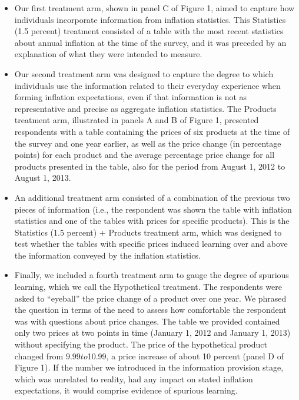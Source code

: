 \documentclass[a4paper, 12pt]{article}
\begin{document}
\begin{itemize}
\begin{itemize}
        \begin{itemize}
            \item Our first treatment arm, shown in panel C of Figure 1, aimed to capture how individuals incorporate information from inflation statistics. This Statistics (1.5 percent) treatment consisted of a table with the most recent statistics about annual inflation at the time of the survey, and it was preceded by an explanation of what they were intended to measure.
            \item Our second treatment arm was designed to capture the degree to which individuals use the information related to their everyday experience when forming inflation expectations, even if that information is not as representative and precise as aggregate inflation statistics. The Products treatment arm, illustrated in panels A and B of Figure 1, presented respondents with a table containing the prices of six products at the time of the survey and one year earlier, as well as the price change (in percentage points) for each product and the average percentage price change for all products presented in the table, also for the period from August 1, 2012 to August 1, 2013.
            \item An additional treatment arm consisted of a combination of the previous two pieces of information (i.e., the respondent was shown the table with inflation statistics and one of the tables with prices for specific products). This is the Statistics (1.5 percent) + Products treatment arm, which was designed to test whether the tables with specific prices induced learning over and above the information conveyed by the inflation statistics.
            \item Finally, we included a fourth treatment arm to gauge the degree of spurious learning, which we call the Hypothetical treatment. The respondents were asked to “eyeball” the price change of a product over one year. We phrased the question in terms of the need to assess how comfortable the respondent was with questions about price changes. The table we provided contained only two prices at two points in time (January 1, 2012 and January 1, 2013) without specifying the product. The price of the hypothetical product changed from $9.99 to $10.99, a price increase of about 10 percent (panel D of Figure 1). If the number we introduced in the information provision stage, which was unrelated to reality, had any impact on stated inflation expectations, it would comprise evidence of spurious learning.
        \end{itemize}
    \end{itemize}
\end{itemize}
\end{document}

